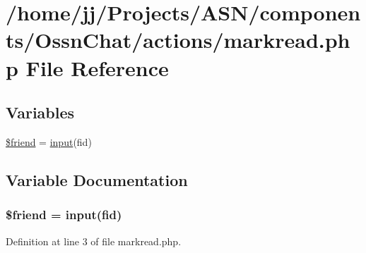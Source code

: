 \hypertarget{_ossn_chat_2actions_2markread_8php}{}\section{/home/jj/\+Projects/\+A\+S\+N/components/\+Ossn\+Chat/actions/markread.php File Reference}
\label{_ossn_chat_2actions_2markread_8php}
\subsection*{Variables}
\begin{DoxyCompactItemize}
\item 
\hyperlink{_ossn_chat_2actions_2markread_8php_a614b5c5dbf84346f452abdd7d0429bce}{\$friend} = \hyperlink{ossn_8lib_8input_8php_a64ebee98b041c4f75f71ed3cd73cc8ed}{input}(\textquotesingle{}fid\textquotesingle{})
\end{DoxyCompactItemize}


\subsection{Variable Documentation}
\subsubsection[{\texorpdfstring{\$friend}{$friend}}]{\setlength{\rightskip}{0pt plus 5cm}\$friend = {\bf input}(\textquotesingle{}fid\textquotesingle{})}\hypertarget{_ossn_chat_2actions_2markread_8php_a614b5c5dbf84346f452abdd7d0429bce}{}\label{_ossn_chat_2actions_2markread_8php_a614b5c5dbf84346f452abdd7d0429bce}


Definition at line 3 of file markread.\+php.

